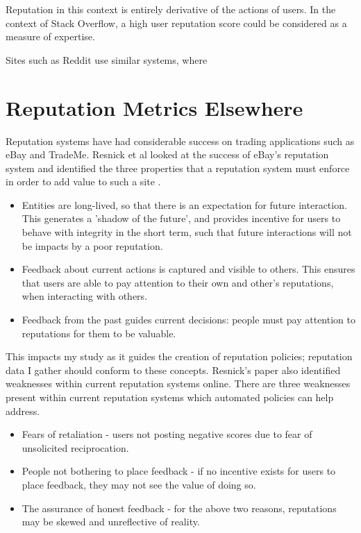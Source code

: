 
\noindent Reputation in this context is entirely derivative of the actions of users. In the context of Stack Overflow, a high user reputation score could be considered as a measure of expertise.

Sites such as Reddit use similar systems, where 

\section{Reputation Metrics Elsewhere}

Reputation systems have had considerable success on trading applications such as eBay and TradeMe. Resnick et al looked at the success of eBay's reputation system and identified the three properties that a reputation system must enforce in order to add value to such a site \cite{}. 

\begin{itemize}
 \item Entities are long-lived, so that there is an expectation for future interaction. This generates a 'shadow of the future', and provides incentive for users to behave with integrity in the short term, such that future interactions will not be impacts by a poor reputation. 
 \item Feedback about current actions is captured and visible to others. This ensures that users are able to pay attention to their own and other's reputations, when interacting with others. 
 \item Feedback from the past guides current decisions: people must pay attention to reputations for them to be valuable. 
\end{itemize}

This impacts my study as it guides the creation of reputation policies; reputation data I gather should conform to these concepts. Resnick's paper also identified weaknesses within current reputation systems online. There are three weaknesses present within current reputation systems which automated policies can help address. 

\begin{itemize}
 \item Fears of retaliation - users not posting negative scores due to fear of unsolicited reciprocation.
 \item People not bothering to place feedback - if no incentive exists for users to place feedback, they may not see the value of doing so.
 \item The assurance of honest feedback - for the above two reasons, reputations may be skewed and unreflective of reality.
\end{itemize}

